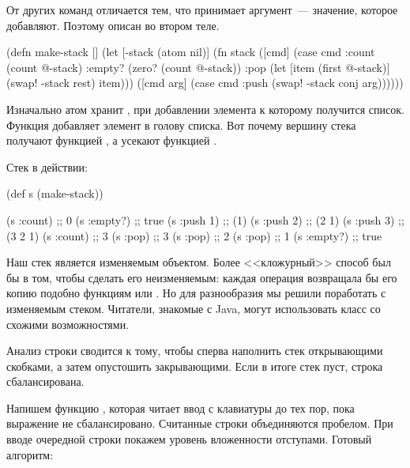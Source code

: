От других команд  отличается тем, что принимает аргумент~--- значение, которое добавляют. Поэтому  описан во втором теле.

\begin{english}
  \begin{clojure/lines}
(defn make-stack
  []
  (let [-stack
        (atom nil)]
    (fn stack
      ([cmd]
       (case cmd
         :count (count @-stack)
         :empty? (zero? (count @-stack))
         :pop (let [item (first @-stack)]
                (swap! -stack rest)
                item)))
      ([cmd arg]
       (case cmd
         :push
         (swap! -stack conj arg))))))
  \end{clojure/lines}
\end{english}

Изначально атом хранит , при добавлении элемента к которому получится список. Функция  добавляет элемент в голову списка. Вот почему вершину стека получают функцией , а усекают функцией  .

\pagebreaklarge

Стек в действии:

\begin{english}
  \begin{clojure}
(def s (make-stack))

(s :count)  ;; 0
(s :empty?) ;; true
(s :push 1) ;; (1)
(s :push 2) ;; (2 1)
(s :push 3) ;; (3 2 1)
(s :count)  ;; 3
(s :pop)    ;; 3
(s :pop)    ;; 2
(s :pop)    ;; 1
(s :empty?) ;; true
  \end{clojure}
\end{english}

Наш стек является изменяемым объектом. Более <<кложурный>> способ был бы в том, чтобы сделать его неизменяемым: каждая операция возвращала бы его копию подобно функциям  или . Но для разнообразия мы решили поработать с изменяемым стеком. Читатели, знакомые с Java, могут использовать класс  со схожими возможностями.

Анализ строки сводится к тому, чтобы сперва наполнить стек открывающими скобками, а затем опустошить закрывающими. Если в итоге стек пуст, строка сбалансирована.

Напишем функцию , которая читает ввод с клавиатуры до тех пор, пока выражение не сбалансировано. Считанные строки объединяются пробелом. При вводе очередной строки покажем уровень вложенности отступами. Готовый алгоритм:

